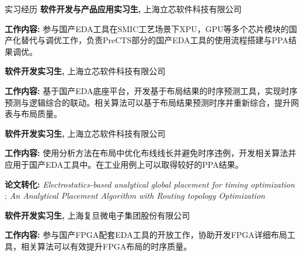 \begin{rubric}{实习经历}
	\entry*[2024/10 -- 2025/8]%
	\textbf{软件开发与产品应用实习生,} 上海立芯软件科技有限公司
	\par \textbf{工作内容:} 参与国产EDA工具在SMIC工艺场景下XPU，GPU等多个芯片模块的国产化替代与调优工作，负责PreCTS部分的国产EDA工具的使用流程搭建与PPA结果调优。

	\entry*[2023/10 -- 2024/9]%
	\textbf{软件开发实习生,} 上海立芯软件科技有限公司
	\par \textbf{工作内容:} 基于国产EDA底座平台，开发基于布局结果的时序预测工具，实现时序预测与逻辑综合的联动。相关算法可以基于布局结果预测时序并重新综合，提升网表与布局质量。

	\entry*[2021/7 -- 2023/9]%
	\textbf{软件开发实习生,} 上海立芯软件科技有限公司
	\par \textbf{工作内容:} 使用分析方法在布局中优化布线线长并避免时序违例，开发相关算法并应用于国产EDA工具中。在工业用例上可以取得较好的PPA结果。
	\par \textbf{论文转化:} \emph{Electrostatics-based analytical global placement for timing optimization} \cite{lin2024electrostatics}; \emph{An Analytical Placement Algorithm with Routing topology Optimization} \cite{wei2024analytical}

	\entry*[2020/9 -- 2021/6]%
	\textbf{软件开发实习生,} 上海复旦微电子集团股份有限公司
	\par \textbf{工作内容:} 参与国产FPGA配套EDA工具的开放工作，协助开发FPGA详细布局工具，相关算法可以有效提升FPGA布局的时序质量。
\end{rubric}
